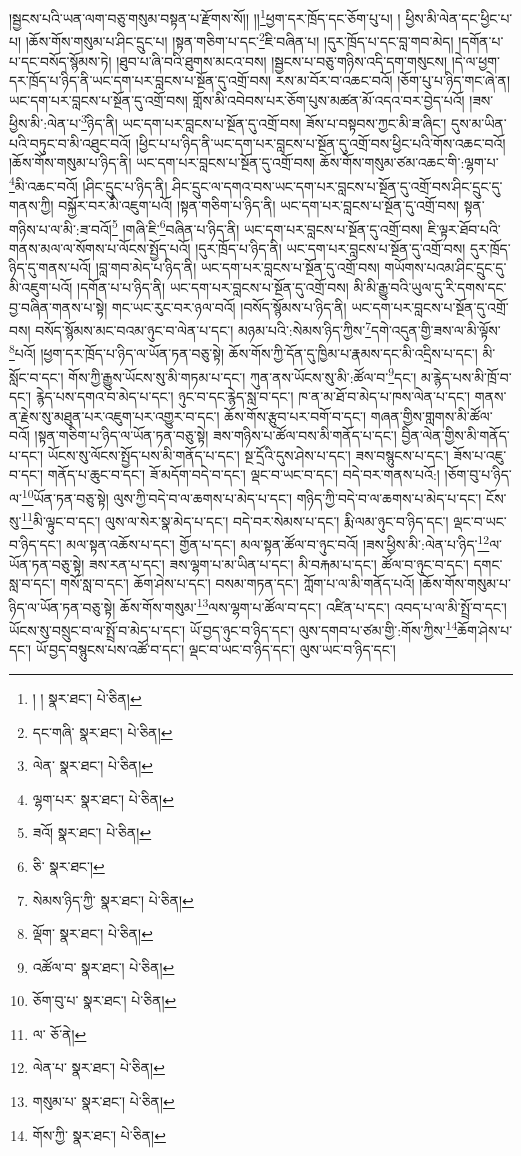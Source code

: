 །སྦྱངས་པའི་ཡན་ལག་བཅུ་གསུམ་བསྟན་པ་རྫོགས་སོ།། །།\footnote{། །  སྣར་ཐང་།  པེ་ཅིན། }ཕྱག་དར་ཁྲོད་དང་ཅོག་པུ་པ། །
ཕྱིས་མི་ལེན་དང་ཕྱིང་པ་པ། །ཆོས་གོས་གསུམ་པ་ཤིང་དྲུང་པ། །སྟན་གཅིག་པ་དང་\footnote{དང་གཞི་  སྣར་ཐང་།  པེ་ཅིན། }ཇི་བཞིན་པ། །དུར་ཁྲོད་པ་དང་བླ་གབ་མེད། །དགོན་པ་པ་དང་བསོད་སྙོམས་ཏེ། །ཐུབ་པ་ཞི་བའི་ཐུགས་མངའ་བས། །སྦྱངས་པ་བཅུ་གཉིས་འདི་དག་གསུངས། །དེ་ལ་ཕྱག་དར་ཁྲོད་པ་ཉིད་ནི་ཡང་དག་པར་བླངས་པ་སྔོན་དུ་འགྲོ་བས། རས་མ་བོར་བ་འཆང་བའོ། །ཅོག་པུ་པ་ཉིད་གང་ཞེ་ན། ཡང་དག་པར་བླངས་པ་སྔོན་དུ་འགྲོ་བས། གློས་མི་འབེབས་པར་ཅོག་པུས་མཚན་མོ་འདའ་བར་བྱེད་པའོ། །ཟས་ཕྱིས་མི་:ལེན་པ་\footnote{ལེན་  སྣར་ཐང་།  པེ་ཅིན། }ཉིད་ནི། ཡང་དག་པར་བླངས་པ་སྔོན་དུ་འགྲོ་བས། ཟོས་པ་བསྟབས་ཀྱང་མི་ཟ་ཞིང་། དུས་མ་ཡིན་པའི་བཏུང་བ་མི་འཐུང་བའོ། །ཕྱིང་པ་པ་ཉིད་ནི་ཡང་དག་པར་བླངས་པ་སྔོན་དུ་འགྲོ་བས་ཕྱིང་པའི་གོས་འཆང་བའོ། །ཆོས་གོས་གསུམ་པ་ཉིད་ནི། ཡང་དག་པར་བླངས་པ་སྔོན་དུ་འགྲོ་བས། ཆོས་གོས་གསུམ་ཙམ་འཆང་གི་:ལྷག་པ་\footnote{ལྷག་པར་  སྣར་ཐང་།  པེ་ཅིན། }མི་འཆང་བའོ། །ཤིང་དྲུང་པ་ཉིད་ནི། ཤིང་དྲུང་ལ་དགའ་བས་ཡང་དག་པར་བླངས་པ་སྔོན་དུ་འགྲོ་བས་ཤིང་དྲུང་དུ་གནས་ཀྱི། བསྐྱོར་བར་མི་འཇུག་པའོ། །སྟན་གཅིག་པ་ཉིད་ནི། ཡང་དག་པར་བླངས་པ་སྔོན་དུ་འགྲོ་བས། སྟན་གཉིས་པ་ལ་མི་:ཟ་བའོ།\footnote{ཟའོ།  སྣར་ཐང་།  པེ་ཅིན། } །གཞི་ཇི་\footnote{ཅི་  སྣར་ཐང་། }བཞིན་པ་ཉིད་ནི། ཡང་དག་པར་བླངས་པ་སྔོན་དུ་འགྲོ་བས། ཇི་ལྟར་ཐོབ་པའི་གནས་མལ་ལ་སོགས་པ་ལོངས་སྤྱོད་པའོ། །དུར་ཁྲོད་པ་ཉིད་ནི། ཡང་དག་པར་བླངས་པ་སྔོན་དུ་འགྲོ་བས། དུར་ཁྲོད་ཉིད་དུ་གནས་པའོ། །བླ་གབ་མེད་པ་ཉིད་ནི། ཡང་དག་པར་བླངས་པ་སྔོན་དུ་འགྲོ་བས། གཡོགས་པའམ་ཤིང་དྲུང་དུ་མི་འཇུག་པའོ། །དགོན་པ་པ་ཉིད་ནི། ཡང་དག་པར་བླངས་པ་སྔོན་དུ་འགྲོ་བས། མི་མི་རྒྱུ་བའི་ཡུལ་དུ་རི་དགས་དང་བྱ་བཞིན་གནས་པ་སྟེ། གང་ཡང་རུང་བར་ཉལ་བའོ། །བསོད་སྙོམས་པ་ཉིད་ནི། ཡང་དག་པར་བླངས་པ་སྔོན་དུ་འགྲོ་བས། བསོད་སྙོམས་མང་བའམ་ཉུང་བ་ལེན་པ་དང་། མཉམ་པའི་:སེམས་ཉིད་ཀྱིས་\footnote{སེམས་ཉིད་ཀྱི་  སྣར་ཐང་།  པེ་ཅིན། }དགེ་འདུན་གྱི་ཟས་ལ་མི་ལྟོས་\footnote{ལྡོག་  སྣར་ཐང་།  པེ་ཅིན། }པའོ། །ཕྱག་དར་ཁྲོད་པ་ཉིད་ལ་ཡོན་ཏན་བཅུ་སྟེ། ཆོས་གོས་ཀྱི་དོན་དུ་ཁྱིམ་པ་རྣམས་དང་མི་འདྲིས་པ་དང་། མི་སློང་བ་དང་། གོས་ཀྱི་རྒྱུས་ཡོངས་སུ་མི་གཏམ་པ་དང་། ཀུན་ནས་ཡོངས་སུ་མི་:ཚོལ་བ་\footnote{འཚོལ་བ་  སྣར་ཐང་།  པེ་ཅིན། }དང་། མ་རྙེད་པས་མི་ཁྲོ་བ་དང་། རྙེད་པས་དགའ་བ་མེད་པ་དང་། ཉུང་བ་དང་རྙེད་སླ་བ་དང་། ཁ་ན་མ་ཐོ་བ་མེད་པ་ཁས་ལེན་པ་དང་། གནས་ན་རྗེས་སུ་མཐུན་པར་འཇུག་པར་འགྱུར་བ་དང་། ཆོས་གོས་རྩུབ་པར་བགོ་བ་དང་། གཞན་གྱིས་གླགས་མི་ཚོལ་བའོ། །སྟན་གཅིག་པ་ཉིད་ལ་ཡོན་ཏན་བཅུ་སྟེ། ཟས་གཉིས་པ་ཚོལ་བས་མི་གནོད་པ་དང་། བྱིན་ལེན་གྱིས་མི་གནོད་པ་དང་། ཡོངས་སུ་ལོངས་སྤྱོད་པས་མི་གནོད་པ་དང་། སྔ་དྲོའི་དུས་ཤེས་པ་དང་། ཟས་བསྙུངས་པ་དང་། ཟོས་པ་འཇུ་བ་དང་། གནོད་པ་ཆུང་བ་དང་། ཟོ་མདོག་བདེ་བ་དང་། ལྡང་བ་ཡང་བ་དང་། བདེ་བར་གནས་པའོ:། །ཅོག་བུ་པ་ཉིད་ལ་\footnote{ཅོག་བུ་པ་  སྣར་ཐང་།  པེ་ཅིན། }ཡོན་ཏན་བཅུ་སྟེ། ལུས་ཀྱི་བདེ་བ་ལ་ཆགས་པ་མེད་པ་དང་། གཉིད་ཀྱི་བདེ་བ་ལ་ཆགས་པ་མེད་པ་དང་། ངོས་སུ་\footnote{ལ་  ཅོ་ནེ། }མི་ལྟུང་བ་དང་། ལུས་ལ་སེར་སྣ་མེད་པ་དང་། བདེ་བར་སེམས་པ་དང་། རྨི་ལམ་ཉུང་བ་ཉིད་དང་། ལྡང་བ་ཡང་བ་ཉིད་དང་། མལ་སྟན་འཆོས་པ་དང་། གྱོན་པ་དང་། མལ་སྟན་ཚོལ་བ་ཉུང་བའོ། །ཟས་ཕྱིས་མི་:ལེན་པ་ཉིད་\footnote{ལེན་པ་  སྣར་ཐང་།  པེ་ཅིན། }ལ་ཡོན་ཏན་བཅུ་སྟེ། ཟས་རན་པ་དང་། ཟས་ལྷག་པ་མ་ཡིན་པ་དང་། མི་བརྐམ་པ་དང་། ཚོལ་བ་ཉུང་བ་དང་། དགང་སླ་བ་དང་། གསོ་སླ་བ་དང་། ཆོག་ཤེས་པ་དང་། བསམ་གཏན་དང་། ཀློག་པ་ལ་མི་གནོད་པའོ། །ཆོས་གོས་གསུམ་པ་ཉིད་ལ་ཡོན་ཏན་བཅུ་སྟེ། ཆོས་གོས་གསུམ་\footnote{གསུམ་པ་  སྣར་ཐང་།  པེ་ཅིན། }ལས་ལྷག་པ་ཚོལ་བ་དང་། འཛིན་པ་དང་། འབད་པ་ལ་མི་སྤྲོ་བ་དང་། ཡོངས་སུ་བསྲུང་བ་ལ་སྤྲོ་བ་མེད་པ་དང་། ཡོ་བྱད་ཉུང་བ་ཉིད་དང་། ལུས་དགབ་པ་ཙམ་གྱི་:གོས་ཀྱིས་\footnote{གོས་ཀྱི་  སྣར་ཐང་།  པེ་ཅིན། }ཆོག་ཤེས་པ་དང་། ཡོ་བྱད་བསྙུངས་པས་འཚོ་བ་དང་། ལྡང་བ་ཡང་བ་ཉིད་དང་། ལུས་ཡང་བ་ཉིད་དང་། 